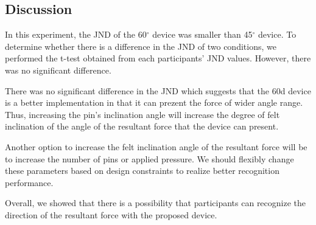 \subsection{Discussion}

In this experiment, the JND of the 60$^{\circ}$ device was smaller than 45$^{\circ}$ device.
To determine whether there is a difference in the JND of two conditions, we performed the t-test obtained from each participants'{} JND values.
However, there was no significant difference.


There was no significant difference in the JND which suggests that the 60d device is a better implementation in that it can prezent the force of wider angle range.
Thus, increasing the pin's inclination angle will increase the degree of felt inclination of the angle of the resultant force that the device can present.

Another option to increase the felt inclination angle of the resultant force will be to increase the number of pins or applied pressure.
We should flexibly change these parameters based on design constraints to realize better recognition performance.

Overall, we showed that there is a possibility that participants can recognize the direction of the resultant force with the proposed device.